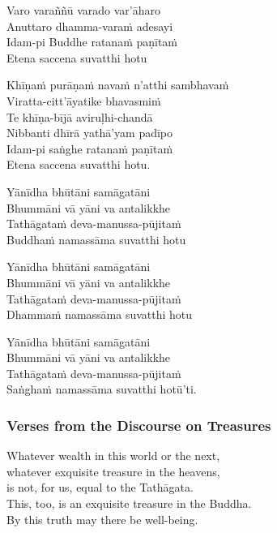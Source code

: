 \begin{paritta}
Varo varaññū varado var'āharo\\
Anuttaro dhamma-varaṁ adesayi\\
Idam-pi Buddhe ratanaṁ paṇītaṁ\\
Etena saccena suvatthi hotu

%
Khīṇaṁ purāṇaṁ navaṁ n'atthi sambhavaṁ\\
Viratta-citt'āyatike bhavasmiṁ\\
Te khīṇa-bījā aviruḷhi-chandā\\
Nibbanti dhīrā yathā'yam padīpo\\
Idam-pi saṅghe ratanaṁ paṇītaṁ\\
Etena saccena suvatthi hotu.

Yānīdha bhūtāni samāgatāni\\
Bhummāni vā yāni va antalikkhe\\
Tathāgataṁ deva-manussa-pūjitaṁ\\
Buddhaṁ namassāma suvatthi hotu

Yānīdha bhūtāni samāgatāni\\
Bhummāni vā yāni va antalikkhe\\
Tathāgataṁ deva-manussa-pūjitaṁ\\
Dhammaṁ namassāma suvatthi hotu

Yānīdha bhūtāni samāgatāni\\
Bhummāni vā yāni va antalikkhe\\
Tathāgataṁ deva-manussa-pūjitaṁ\\
Saṅghaṁ namassāma suvatthi hotū'ti. 

\end{paritta}

\subsubsection{Verses from the Discourse on Treasures}


%
Whatever wealth in this world or the next,\\
whatever exquisite treasure in the heavens,\\
is not, for us, equal to the Tathāgata.\\
This, too, is an exquisite treasure in the Buddha.\\
By this truth may there be well-being.

\enlargethispage{\baselineskip}


